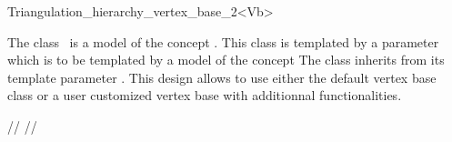 

\begin{ccRefClass}{Triangulation_hierarchy_vertex_base_2<Vb>}  %


\ccDefinition
  
The class \ccRefName\ is a model of the concept
.
This class is templated by a parameter 
which is to be templated by a model of  the concept
The class  inherits
from its template parameter .
This design allows to use either the default
vertex base class or a user customized
vertex base with additionnal functionalities.


\ccIsModel
{}

\ccInheritsFrom
{}

\ccTypes
{}

\ccSeeAlso
{} //
 //




\end{ccRefClass}


